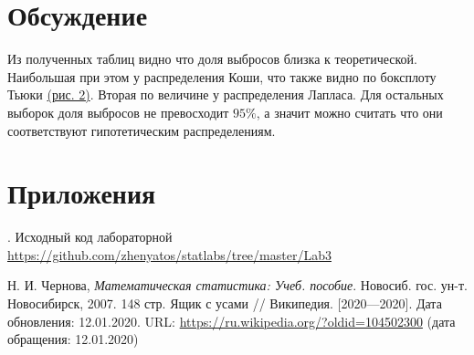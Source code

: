 \documentclass[12pt,a4paper]{article}
\begin{document}
\pagebreak

\section{Обсуждение}
Из полученных таблиц видно что доля выбросов близка к теоретической. Наибольшая при этом у распределения Коши, что также видно по боксплоту Тьюки \hyperref[fig:image:cauchy]{(рис. 2)}. Вторая по величине у распределения Лапласа. Для остальных выборок доля выбросов не превосходит $95\%$, а значит можно считать что они соответствуют гипотетическим распределениям.

\pagebreak

\section{Приложения}
. Исходный код лабораторной {\url{https://github.com/zhenyatos/statlabs/tree/master/Lab3}}

\begin{thebibliography}{9} 
	 Н. И. Чернова, \emph{Математическая статистика: Учеб. пособие}. Новосиб. гос. ун-т. Новосибирск, 2007. 148 стр.
	 Ящик с усами // Википедия. [2020—2020]. Дата обновления: 12.01.2020. URL: \url{https://ru.wikipedia.org/?oldid=104502300} (дата обращения: 12.01.2020)
\end{thebibliography}
\end{document}

